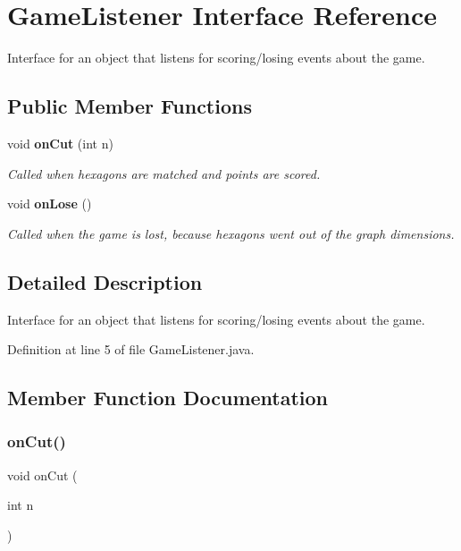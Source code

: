 \section{Game\+Listener Interface Reference}
\label{interfaceunitingtwist_1_1_game_listener}


Interface for an object that listens for scoring/losing events about the game.  


\subsection*{Public Member Functions}
\begin{DoxyCompactItemize}
\item 
void \textbf{ on\+Cut} (int n)
\begin{DoxyCompactList}\small\item\em Called when hexagons are matched and points are scored. \end{DoxyCompactList}\item 
void \textbf{ on\+Lose} ()
\begin{DoxyCompactList}\small\item\em Called when the game is lost, because hexagons went out of the graph dimensions. \end{DoxyCompactList}\end{DoxyCompactItemize}


\subsection{Detailed Description}
Interface for an object that listens for scoring/losing events about the game. 

Definition at line 5 of file Game\+Listener.\+java.



\subsection{Member Function Documentation}
\mbox{\label{interfaceunitingtwist_1_1_game_listener_ac9f99a8933b01d99f8e7b23f4f871a23}} 
\subsubsection{on\+Cut()}
{\footnotesize\ttfamily void on\+Cut (\begin{DoxyParamCaption}\item[{int}]{n }\end{DoxyParamCaption})}



